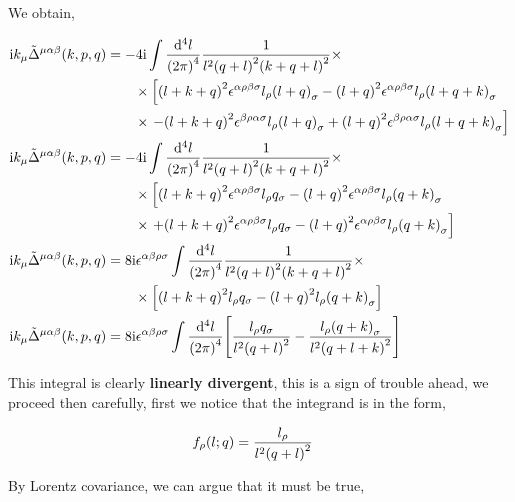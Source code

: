 We obtain,

\begin{align}
    \textnormal{i} k_\mu{\tilde\Delta}^{\mu\alpha\beta}\qty(k,p,q)&=-4\textnormal{i}
    \int\frac{\dd[4]{l}}{\qty(2\pi)^4}\frac{1}{l^2\qty(q+l)^2\qty(k+q+l)^2}\times\nonumber\\
    &\quad\quad\times\left[
    \qty(l+k+q)^2\epsilon^{\alpha\rho\beta\sigma}l_\rho\qty(l+q)_\sigma-\qty(l+q)^2\epsilon^{\alpha\rho\beta\sigma}l_\rho\qty(l+q+k)_\sigma\right.\nonumber\\
    &\quad\quad\times\left.
    -\qty(l+k+q)^2\epsilon^{\beta\rho\alpha\sigma}l_\rho\qty(l+q)_\sigma+\qty(l+q)^2\epsilon^{\beta\rho\alpha\sigma}l_\rho\qty(l+q+k)_\sigma\right]\nonumber\\
    \textnormal{i} k_\mu{\tilde\Delta}^{\mu\alpha\beta}\qty(k,p,q)&=-4\textnormal{i}
    \int\frac{\dd[4]{l}}{\qty(2\pi)^4}\frac{1}{l^2\qty(q+l)^2\qty(k+q+l)^2}\times\nonumber\\
    &\quad\quad\times\left[
    \qty(l+k+q)^2\epsilon^{\alpha\rho\beta\sigma}l_\rho q_\sigma-\qty(l+q)^2\epsilon^{\alpha\rho\beta\sigma}l_\rho\qty(q+k)_\sigma\right.\nonumber\\
    &\quad\quad\times\left.
    +\qty(l+k+q)^2\epsilon^{\alpha\rho\beta\sigma}l_\rho q_\sigma-\qty(l+q)^2\epsilon^{\alpha\rho\beta\sigma}l_\rho\qty(q+k)_\sigma\right]\nonumber\\
    \textnormal{i} k_\mu{\tilde\Delta}^{\mu\alpha\beta}\qty(k,p,q)&=8\textnormal{i}\epsilon^{\alpha\beta\rho\sigma}
    \int\frac{\dd[4]{l}}{\qty(2\pi)^4}\frac{1}{l^2\qty(q+l)^2\qty(k+q+l)^2}\times\nonumber\\
    &\quad\quad\times\left[
    \qty(l+k+q)^2l_\rho q_\sigma-\qty(l+q)^2l_\rho\qty(q+k)_\sigma\right]\nonumber\\
    \textnormal{i} k_\mu{\tilde\Delta}^{\mu\alpha\beta}\qty(k,p,q)&=8\textnormal{i}\epsilon^{\alpha\beta\rho\sigma}
    \int\frac{\dd[4]{l}}{\qty(2\pi)^4}\qty[
        \frac{l_\rho q_\sigma}{l^2\qty(q+l)^2}-\frac{l_\rho\qty(q+k)_\sigma}{l^2\qty(q+l+k)^2}]\nonumber
\end{align}

This integral is clearly \textbf{linearly divergent}, this is a sign of trouble ahead, we proceed then carefully, 
first we notice that the integrand is in the form,

\begin{align}
    f_\rho\qty(l;q)&=\frac{l_\rho}{l^2\qty(q+l)^2}\nonumber
\end{align}

By Lorentz covariance, we can argue that it must be true,


